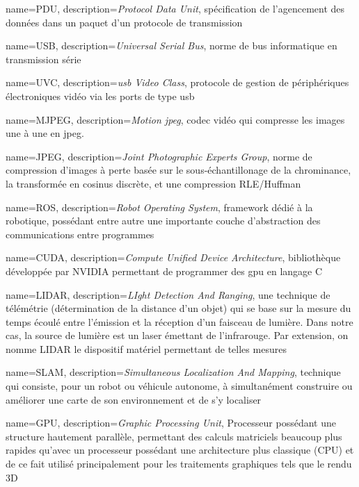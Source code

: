 \makeglossaries

{
	name={PDU},
	description={\emph{Protocol Data Unit}, spécification de l'agencement des données dans un paquet d'un protocole de transmission}
}

{
	name={USB},
	description={\emph{Universal Serial Bus}, norme de bus informatique en transmission série}
}

{
	name={UVC},
	description={\emph{\gls{usb} Video Class}, protocole de gestion de périphériques électroniques vidéo via les ports de type \gls{usb}}
}

{
	name={MJPEG},
	description={\emph{Motion \gls{jpeg}}, codec vidéo qui compresse les images une à une en \gls{jpeg}.}
}

{
	name={JPEG},
	description={\emph{Joint Photographic Experts Group}, norme de compression d'images à perte basée sur le sous-échantillonage de la chrominance, la transformée en cosinus discrète, et une compression RLE/Huffman}
}

{
	name={ROS},
	description={\emph{Robot Operating System}, framework dédié à la robotique, possédant entre autre une importante couche d'abstraction des communications entre programmes}
}

{
	name={CUDA},
	description={\emph{Compute Unified Device Architecture}, bibliothèque développée par NVIDIA permettant de programmer des \gls{gpu} en langage C}
}


{
	name={LIDAR},
	description={\emph{LIght Detection And Ranging}, une technique de télémétrie (détermination de la distance d'un objet) qui se base sur la mesure du temps écoulé entre l'émission et la réception d'un faisceau de lumière. Dans notre cas, la source de lumière est un laser émettant de l'infrarouge. Par extension, on nomme LIDAR le dispositif matériel permettant de telles mesures}
}

{
	name={SLAM},
	description={\emph{Simultaneous Localization And Mapping}, technique qui consiste, pour un robot ou véhicule autonome, à simultanément construire ou améliorer une carte de son environnement et de s’y localiser}
}

{
	name={GPU},
	description={\emph{Graphic Processing Unit}, Processeur possédant une structure hautement parallèle, permettant des calculs matriciels beaucoup plus rapides qu'avec un processeur possédant une architecture plus classique (CPU) et de ce fait utilisé principalement pour les traitements graphiques tels que le rendu 3D}
}


